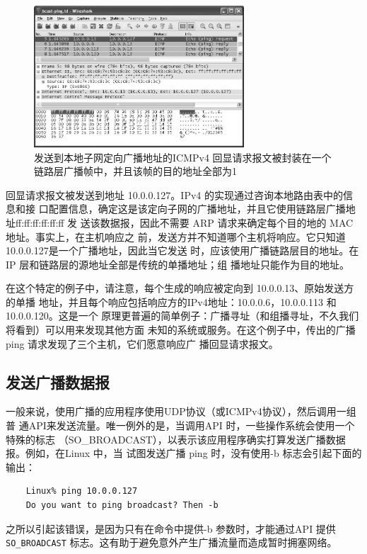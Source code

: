 \begin{figure}[ht]
  \centering
  \includegraphics[width=0.7\textwidth]{imgs/9/9-1.png}
  \caption{发送到本地子网定向广播地址的ICMPv4 回显请求报文被封装在一个链路层广播帧中，并且该帧的目的地址全部为1}
\end{figure}

回显请求报文被发送到地址 10.0.0.127。IPv4 的实现通过咨询本地路由表中的信息和接
口配置信息，确定这是该定向子网的广播地址，并且它使用链路层广播地址ff:ff:ff:ff:ff:ff 发
送该数据报，因此不需要 ARP 请求来确定每个目的地的 MAC地址。事实上，在主机响应之
前，发送方并不知道哪个主机将响应。它只知道10.0.0.127是一个广播地址，因此当它发送
时，应该使用广播链路层目的地址。在IP 层和链路层的源地址全部是传统的单播地址；组
播地址只能作为目的地址。

在这个特定的例子中，请注意，每个生成的响应被定向到 10.0.0.13、原始发送方的单播
地址，并且每个响应包括响应方的IPv4地址：10.0.0.6，10.0.0.113 和 10.0.0.120。这是一个
原理更普遍的简单例子：广播寻址（和组播寻址，不久我们将看到）可以用来发现其他方面
未知的系统或服务。在这个例子中，传出的广播 ping 请求发现了三个主机，它们愿意响应广
播回显请求报文。

\subsection{发送广播数据报}
一般来说，使用广播的应用程序使用UDP协议（或ICMPv4协议），然后调用一组普
通API来发送流量。唯一例外的是，当调用API 时，一些操作系统会使用一个特殊的标志
（SO\_BROADCAST），以表示该应用程序确实打算发送广播数据报。例如，在Linux 中，当
试图发送广播 ping 时，没有使用-b 标志会引起下面的输出：

\begin{verbatim}
    Linux% ping 10.0.0.127
    Do you want to ping broadcast? Then -b
\end{verbatim}

之所以引起该错误，是因为只有在命令中提供-b 参数时，才能通过API 提供\verb|SO_BROADCAST|
标志。这有助于避免意外产生广播流量而造成暂时拥塞网络。

